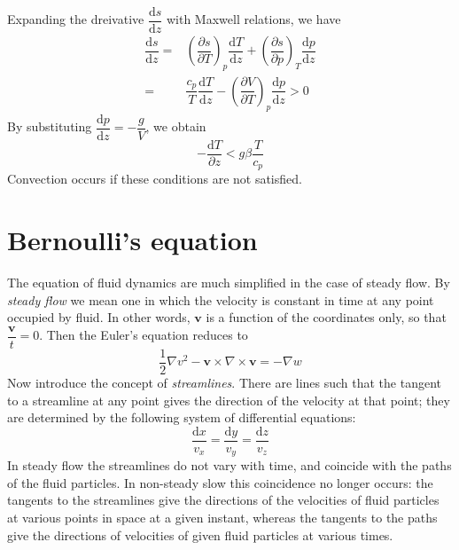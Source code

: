 \documentclass[conference]{IEEEtran}
\theoremstyle{definition}
\theoremstyle{remark}
\begin{document}
    Expanding the dreivative $\dfrac{\mathrm{d} s}{\mathrm{d} z}$ with Maxwell relations, we have
    \begin{align}
        \dfrac{\mathrm{d} s}{\mathrm{d} z} =& \left( \dfrac{\partial s}{\partial T} \right)_p \dfrac{\mathrm{d} T}{\mathrm{d} z} + \left( \dfrac{\partial s}{\partial p} \right)_T \dfrac{\mathrm{d} p}{\mathrm{d} z} \nonumber \\
        =& \dfrac{c_p}{T} \dfrac{\mathrm{d} T}{\mathrm{d} z} - \left( \dfrac{\partial V}{\partial T} \right)_p \dfrac{\mathrm{d} p}{\mathrm{d} z} > 0
    \end{align}
    By substituting $\dfrac{\mathrm{d} p}{\mathrm{d} z} = -\dfrac{g}{V}$, we obtain
    \begin{equation}
        -\dfrac{\mathrm{d} T}{\partial z} < g\beta \dfrac{T}{c_p}
    \end{equation}
    Convection occurs if these conditions are not satisfied.

    \section{Bernoulli's equation}
    The equation of fluid dynamics are much simplified in the case of steady flow. By \emph{steady flow} we mean one in which the velocity is constant in time at any point occupied by fluid. In other words, $\mathbf{v}$ is a function of the coordinates only, so that $\dfrac{\mathbf{v}}{t} = 0$. Then the Euler's equation reduces to 
    \begin{equation}
        \dfrac12 \nabla v^2 - \mathbf{v} \times \nabla \times \mathbf{v} = -\nabla w
    \end{equation}
    Now introduce the concept of \emph{streamlines}. There are lines such that the tangent to a streamline at any point gives the direction of the velocity at that point; they are determined by the following system of differential equations:
    \begin{equation}
        \dfrac{\mathrm{d} x}{v_x} = \dfrac{\mathrm{d} y}{v_y} = \dfrac{\mathrm{d} z}{v_z}
    \end{equation}
    In steady flow the streamlines do not vary with time, and coincide with the paths of the fluid particles. In non-steady slow this coincidence no longer occurs: the tangents to the streamlines give the directions of the velocities of fluid particles at various points in space at a given instant, whereas the tangents to the paths give the directions of velocities of given fluid particles at various times.

    
\end{document}
